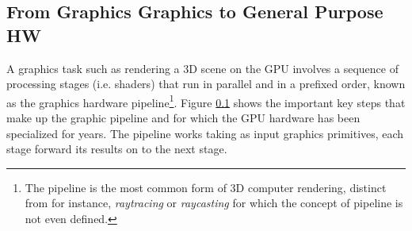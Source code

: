     \subsection{From Graphics Graphics to General Purpose HW}\label{graphicPipeline}
    A graphics task such as rendering a 3D scene on the GPU
    involves a sequence of processing stages (i.e. shaders) that run in parallel
    and in a prefixed order, known as the graphics hardware
    pipeline\footnote{The pipeline is the most common form of 3D computer rendering, distinct from for instance, \textit{raytracing} or \textit{raycasting} for which the concept of pipeline is not even defined.}. Figure \ref{graphicPipeline} shows the important key steps that make up the graphic pipeline and for which the GPU hardware has been specialized for years. The pipeline works taking as input graphics primitives, each stage forward its results on to the next stage.

